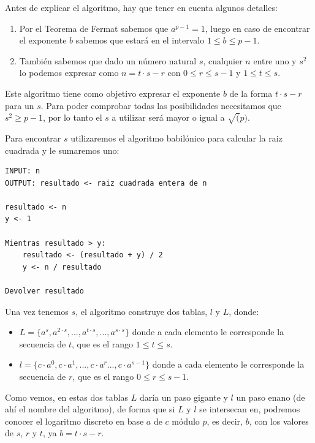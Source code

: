 \documentclass[12pt, spanish]{article}
\begin{document}
Antes de explicar el algoritmo, hay que tener en cuenta algunos detalles:

\begin{enumerate}
	\item Por el Teorema de Fermat sabemos que $a^{p - 1} = 1$, luego en caso de encontrar el exponente $b$ sabemos que estará en el intervalo $1 \leq b \leq p - 1$.
	\item  También sabemos que dado un número natural $s$, cualquier $n$ entre uno y $s^2$ lo podemos expresar como $n = t \cdot s - r$ con $0 \leq r \leq s - 1$ y $1 \leq t \leq s$.
\end{enumerate}

Este algoritmo tiene como objetivo expresar el exponente $b$ de la forma $t \cdot s - r$ para un $s$. Para poder comprobar todas las posibilidades necesitamos que $s^2 \geq p - 1$, por lo tanto el $s$ a utilizar será mayor o igual a $\sqrt(p)$.

Para encontrar $s$ utilizaremos el algoritmo babilónico para calcular la raiz cuadrada y le sumaremos uno:

\begin{lstlisting}[caption={Algoritmo babilónico}]
INPUT: n
OUTPUT: resultado <- raiz cuadrada entera de n

resultado <- n
y <- 1

Mientras resultado > y:
	resultado <- (resultado + y) / 2
	y <- n / resultado

Devolver resultado
\end{lstlisting}

Una vez tenemos $s$, el algoritmo construye dos tablas, $l$ y $L$, donde:

\begin{itemize}
	\item $L = \{a^{s}, a^{2 \cdot s}, ..., a^{t \cdot s}, ..., a^{s \cdot s}\}$ donde a cada elemento le corresponde la secuencia de $t$, que es el rango $1 \leq t \leq s$.
	\item $l = \{c \cdot a^0, c \cdot a^1, ..., c \cdot a^{r} ..., c \cdot a^{s - 1} \}$ donde a cada elemento le corresponde la secuencia de $r$, que es el rango $0 \leq r \leq s - 1$.
\end{itemize}

Como vemos, en estas dos tablas $L$ daría un paso gigante y $l$ un paso enano (de ahí el nombre del algoritmo), de forma que si $L$ y $l$ se intersecan en, podremos conocer el logaritmo discreto en base $a$ de $c$ módulo $p$, es decir, $b$, con los valores de $s$, $r$ y $t$, ya $b = t \cdot s - r$.
\end{document}
